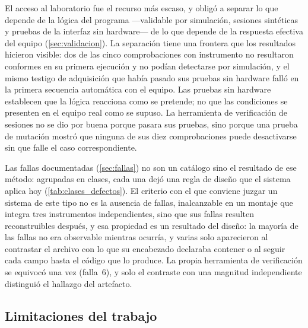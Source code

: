 El acceso al laboratorio fue el recurso más escaso, y obligó a separar
lo que depende de la lógica del programa ---validable por simulación,
sesiones sintéticas y pruebas de la interfaz sin hardware--- de lo que
depende de la respuesta efectiva del equipo (\cref{sec:validacion}). La
separación tiene una frontera que los resultados hicieron visible:
dos de las cinco comprobaciones con instrumento no resultaron conformes
en su primera ejecución y no podían detectarse por simulación, y el
mismo testigo de adquisición que había
pasado sus pruebas sin hardware falló en la primera secuencia
automática con el equipo. Las pruebas sin hardware establecen que la
lógica reacciona como se pretende; no que las condiciones se presenten
en el equipo real como se supuso. La herramienta de verificación de
sesiones no se dio por buena porque pasara sus pruebas, sino porque una
prueba de mutación mostró que ninguna de sus diez comprobaciones puede
desactivarse sin que falle el caso correspondiente.

Las fallas documentadas (\cref{sec:fallas}) no son un catálogo sino el
resultado de ese método: agrupadas en clases, cada una dejó una regla de
diseño que el sistema aplica hoy (\cref{tab:clases_defectos}). El
criterio con el que conviene juzgar un sistema de este tipo no es la
ausencia de fallas, inalcanzable en un montaje que integra tres
instrumentos independientes, sino que sus fallas resulten
reconstruibles después, y esa propiedad es un resultado del diseño: la
mayoría de las fallas no era observable mientras ocurría, y varias solo
aparecieron al contrastar el archivo con lo que su encabezado declaraba
contener o al seguir cada campo hasta el código que lo produce. La
propia herramienta de verificación se equivocó una vez (falla~6), y
solo el contraste con una magnitud independiente distinguió el hallazgo
del artefacto.

\subsection*{Limitaciones del trabajo}
\label{sec:limitaciones}


